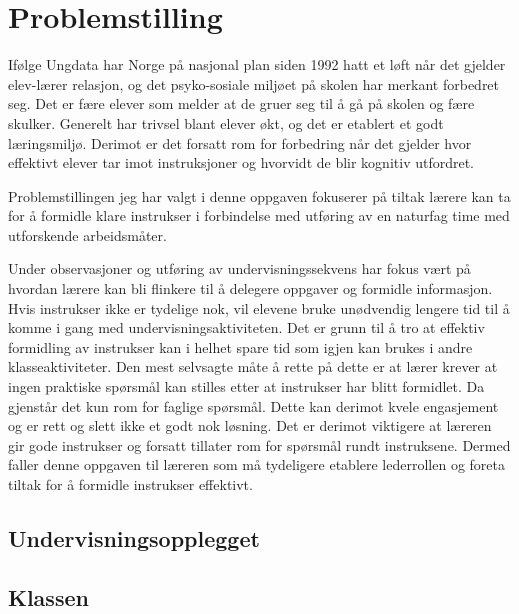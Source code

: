 \documentclass[main.tex]{subfiles}
\begin{document}
\section*{Problemstilling}      
If\o lge Ungdata\cite[legg til tekst]{ungdata} har Norge p\aa\hspace{1mm} nasjonal plan siden 1992 hatt et l\o ft n\aa r det gjelder elev-l\ae rer 
relasjon, og det psyko-sosiale milj\o et p\aa\hspace{1mm} skolen har merkant 
forbedret seg. Det er f\ae re elever som melder at de gruer seg til \aa\hspace{1mm} 
g\aa\hspace{1mm} p\aa\hspace{1mm} skolen og f\ae re skulker. Generelt har trivsel 
blant elever \o kt, og det er etablert et godt l\ae ringsmilj\o . Derimot er det 
forsatt rom for forbedring n\aa r det gjelder hvor effektivt elever tar imot 
instruksjoner og hvorvidt de blir kognitiv utfordret. \newline

Problemstillingen jeg har valgt i denne oppgaven fokuserer  p\aa\hspace{1mm} tiltak 
l\ae rere kan ta for \aa\hspace{1mm} formidle klare instrukser i forbindelse med utf\o ring av en naturfag time med utforskende arbeidsm\aa ter. 
\newline

Under observasjoner og 
utf\o ring av undervisningssekvens har fokus v\ae rt p\aa\hspace{1mm} hvordan 
l\ae rere kan bli flinkere til \aa\hspace{1mm} delegere oppgaver og formidle 
informasjon. Hvis instrukser ikke er tydelige nok, vil elevene bruke un\o dvendig 
lengere tid til \aa\hspace{1mm} komme i gang med undervisningsaktiviteten. Det 
er grunn til \aa\hspace{1mm} tro at effektiv formidling av instrukser kan i 
helhet spare tid som igjen kan brukes i andre klasseaktiviteter. Den mest selvsagte m\aa te
\aa\hspace{1mm} rette p\aa\hspace{1mm} dette er at l\ae rer krever at ingen
praktiske
sp\o rsm\aa l kan stilles etter at instrukser har blitt formidlet. Da gjenst\aa r
det kun rom for faglige sp\o rsm\aa l. Dette kan derimot kvele engasjement og er
rett og slett ikke et godt nok l\o sning. Det er derimot viktigere at l\ae reren
gir gode instrukser og forsatt tillater rom for sp\o rsm\aa l rundt instruksene.
Dermed faller denne oppgaven til l\ae reren som m\aa\hspace{1mm} tydeligere
etablere lederrollen og foreta tiltak for \aa\hspace{1mm} formidle instrukser 
effektivt.

\subsection*{Undervisningsopplegget}

\subsection*{Klassen}
\newpage\null
\end{document}
